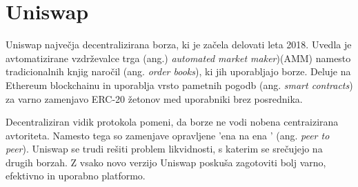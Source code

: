 \documentclass[a4paper,12pt]{article}%
\begin{document}

 

\section{Uniswap}
Uniswap največja decentralizirana borza, ki je začela delovati leta 2018. Uvedla je avtomatizirane vzdrževalce trga (ang.) \textit{automated market maker})(AMM) namesto tradicionalnih knjig naročil (ang. \textit{order books}), ki jih uporabljajo borze. Deluje na Ethereum blockchainu in uporablja vrsto pametnih pogodb (ang. \textit{smart contracts}) za varno zamenjavo ERC-20 žetonov med uporabniki brez posrednika. 

Decentraliziran vidik protokola pomeni, da borze ne vodi nobena centraizirana avtoriteta. Namesto tega so zamenjave opravljene 'ena na ena ' (ang. \textit{peer to peer}). Uniswap se trudi rešiti problem likvidnosti, s katerim se srečujejo na drugih borzah. Z vsako novo verzijo Uniswap poskuša zagotoviti bolj varno, efektivno in uporabno platformo. 

\end{document}
